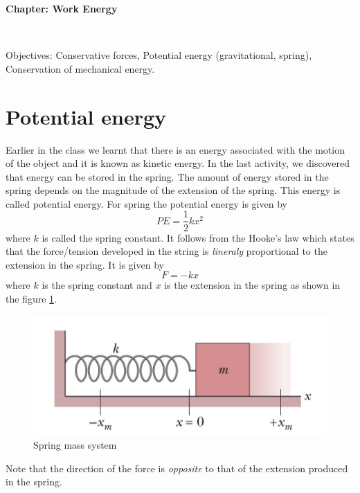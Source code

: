 \documentclass[10pt]{article}
\date{2014-6-22}
\begin{document}
\begin{center}
\begin{Large}\textbf{Chapter: Work Energy}\end{Large} \\
\smallskip
\end{center}
Objectives: Conservative forces, Potential energy (gravitational, spring), Conservation of mechanical energy.
\section{Potential energy}
Earlier in the class we learnt that there is an energy associated with the motion of the object and it is known as kinetic energy.  In the last activity, we discovered that energy can be stored in the spring.  The amount of energy stored in the spring depends on the magnitude of the extension of the spring.  This energy is called potential energy.  For spring the potential energy is given by
\begin{equation}
  PE = \frac{1}{2}kx^2
\end{equation}
where $k$ is called the spring constant.  It follows from the Hooke's law which states that the force/tension developed in the string is \emph{lineraly} proportional to the extension in the spring.  It is given by
\begin{equation}
  F = -kx
\end{equation}
where $k$ is the spring constant and $x$ is the extension in the spring as shown in the figure \ref{springhooke}.
\begin{figure}[h]
\label{springhooke}
\includegraphics[scale=1]{springhooke}
\centering
\caption{Spring mass system}
\centering
\end{figure}
Note that the direction of the force is \emph{opposite} to that of the extension produced in the spring.
\end{document}
